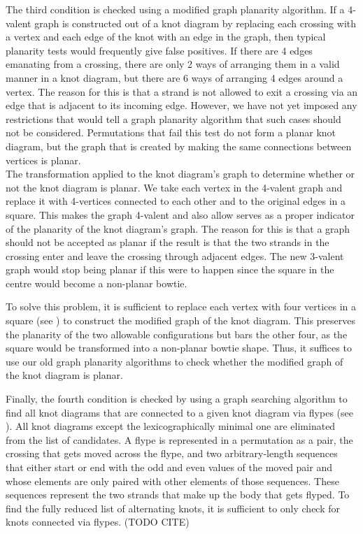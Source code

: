 \begin{paper}
The third condition is checked using a modified graph planarity algorithm.
If a 4-valent graph is constructed out of a knot diagram by replacing each
crossing with a vertex and each edge of the knot with an edge in the graph, then
typical planarity tests would frequently give false positives.
If there are 4 edges emanating from a crossing, there are only 2 ways of
arranging them in a valid manner in a knot diagram, but there are 6 ways of
arranging 4 edges around a vertex.
The reason for this is that a strand is not allowed to exit a crossing via an
edge that is adjacent to its incoming edge.
However, we have not yet imposed any restrictions that would tell a graph
planarity algorithm that such cases should not be considered.
Permutations that fail this test do not form a planar knot diagram, but the
graph that is created by making the same connections between vertices is
planar.\\

{The transformation applied to the knot diagram's graph to determine whether or
not the knot diagram is planar.
We take each vertex in the 4-valent graph and replace it with 4-vertices
connected to each other and to the original edges in a square.
This makes the graph 4-valent and also allow serves as a proper indicator of the
planarity of the knot diagram's graph.
The reason for this is that a graph should not be accepted as planar if the
result is that the two strands in the crossing enter and leave the crossing
through adjacent edges.
The new 3-valent graph would stop being planar if this were to happen since the
square in the centre would become a non-planar bowtie.}

To solve this problem, it is sufficient to replace each vertex with four
vertices in a square (see \figGraph) to construct the modified graph of the
knot diagram.
This preserves the planarity of the two allowable configurations but bars the
other four, as the square would be transformed into a non-planar bowtie shape.
Thus, it suffices to use our old graph planarity algorithms to check whether the
modified graph of the knot diagram is planar.


Finally, the fourth condition is checked by using a graph searching algorithm to
find all knot diagrams that are connected to a given knot diagram via flypes
(see \figMoves).
All knot diagrams except the lexicographically minimal one are eliminated from
the list of candidates.
A flype is represented in a permutation as a pair, the crossing that gets moved
across the flype, and two arbitrary-length sequences that either start or end
with the odd and even values of the moved pair and whose elements are only
paired with other elements of those sequences.
These sequences represent the two strands that make up the body that gets
flyped.
To find the fully reduced list of alternating knots, it is sufficient to only
check for knots connected via flypes. (TODO CITE)


\end{paper}
